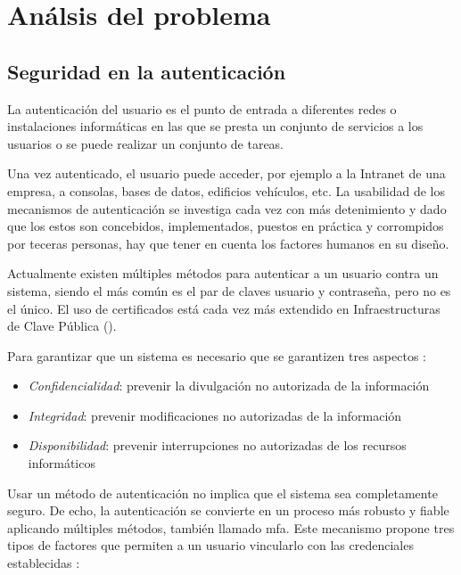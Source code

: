 \cleardoublepage

\chapter{Análsis del problema}

\section{Seguridad en la autenticación}

La autenticación del usuario es el punto de entrada a diferentes redes o instalaciones informáticas en las que se presta un 
conjunto de servicios a los usuarios o se puede realizar un conjunto de tareas. 

Una vez autenticado, el usuario puede acceder, por ejemplo a la Intranet de una empresa, a consolas, bases de datos, edificios 
vehículos, etc. La usabilidad de los mecanismos de autenticación se investiga cada vez con más detenimiento y dado que los 
estos son concebidos, implementados, puestos en práctica y corrompidos por teceras personas, hay que tener en cuenta los factores 
humanos en su diseño. 

Actualmente existen múltiples métodos para autenticar a un usuario contra un sistema, siendo el más común es el par de claves 
usuario y contraseña, pero no es el único. El uso de certificados está cada vez más extendido en Infraestructuras de Clave 
Pública (). 

Para garantizar que un sistema es necesario que se garantizen tres aspectos \cite{bases_seguridad}:

\begin{itemize}
    \item \textit{Confidencialidad}: prevenir la divulgación no autorizada de la información
    \item \textit{Integridad}: prevenir modificaciones no autorizadas de la información
    \item \textit{Disponibilidad}: prevenir interrupciones no autorizadas de los recursos informáticos
\end{itemize}

Usar un método de autenticación no implica que el sistema sea completamente seguro. De echo, la autenticación se convierte en 
un proceso más robusto y fiable aplicando múltiples métodos, también llamado \acrfull{mfa}. Este mecanismo propone tres tipos 
de factores que permiten a un usuario vincularlo con las credenciales establecidas \cite{ometov2018multi}:

